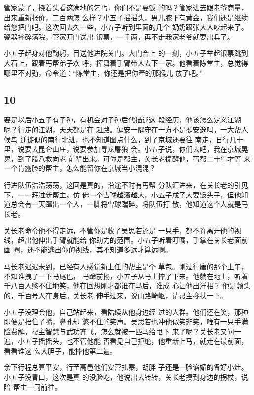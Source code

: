 管家蒙了，挠着头看这满地的乞丐，你们不是要饭
的吗？管家进去跟老爷商量，出来重新报价，二百两怎
么样？小五子摇摇头，男儿膝下有黄金，我们还是继续
给您把门吧。这次回去久一些，小五子听到里面的几个
奶奶跟张大人吵起来了。瓷器摔碎满院，管家开门送出
银票，一千两，再不走我家老爷就要出兵了。

小五子起身对他鞠躬，目送他进院关门。大门合上
的一刻，小五子举起银票跳到大石上，跟着丐帮弟子欢
呼，挥舞着手臂带人去下一家。他看着陈堂主，总觉得
哪里不对劲，命令道：“陈堂主，你还是把你牵的那猴儿
放了吧。”
\newline

{\centering\subsection{10}}

要是以后小五子有子孙，有机会对子孙后代描述这
段经历，他该怎么定义江湖呢？行走的江湖，天天都是在
赶路。偏安一隅守在一方不是挺安逸吗，一大帮人候鸟
迁徙似的南行北进，也不知道图点什么，到了京城还要往
南走，日行几十里，说要去昆仑山庄，说要参加寻龙屠狼
会。小五子说，你们去吧，我在京城晃晃，到了腊八救向老
前辈出来。可你是帮主，关长老提醒他，丐帮二十年才等
来一个肯露脸的帮主，怎么能留你在京城当小混混？

行进队伍浩浩荡荡，这回是真的，沿途不时有丐帮
分队汇进来，在关长老的引见下，一一拜过新帮主。仿
佛一个雪球越滚越大，小五子成了大要饭头子，但他知
道总会有一天蹿出一个人，一脚将雪球踹碎，将队伍打
散，他知道这个人就是马长老。

关长老命令他不得走远，不管你是收了吴思若还是
一只手，都不许离开他的视线，超出他伸出手臂就能给
你助力的范围。小五子听着叮嘱，手掌在关长老面前画
圈，还不能逃出你的视线，其不知道多远才算远啊。

马长老迟迟未到，已经有人感觉新上任的帮主是个
草包。刚过行唐的那个上午，不知谁拽了一下马尾巴，
马蹄前扬，小五子从马上摔了下来。他躺在地上，听着
千八百人憋不住地笑，他在回想刚才都谁在马后，谁成
心让他出洋相？ 他是领头的，千百号人在身后。关长老
伸手过来，说山路崎岖，请帮主搀扶一下。

小五子没理会他，自己站起来，看陆续从他身边经
过的人群。他们还在笑，那种即便是捂住了嘴，鼻孔却
憋不住的笑声。吴思若也冲他似笑非笑，唯有一只手满
险费解，帮主智慧与武功齐飞，怎么就被一匹马给甩下
来了呢？关长老又问一遍，小五子摇摇头，也不管他能
否看见自己拒绝，他重新上马，就走在最前面，看看谁这
么大胆子，能摔他第二遍。

余下行程总算平安，行至高邑他们安营扎寨，胡胖
子还是一脸谄媚的备好小灶。小五子没胃口，这次是真
的没脸吃，他说出去转转，关长老摸到身边的拐杖，说陪
帮主一同前往。

